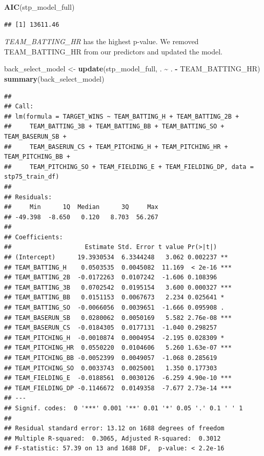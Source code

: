 \documentclass[
]{article}
\newenvironment{Shaded}{\begin{snugshade}}{\end{snugshade}}
\newcommand{\FunctionTok}[1]{\textcolor[rgb]{0.13,0.29,0.53}{\textbf{#1}}}
\newcommand{\NormalTok}[1]{#1}
\newcommand{\OtherTok}[1]{\textcolor[rgb]{0.56,0.35,0.01}{#1}}
\newcommand{\SpecialCharTok}[1]{\textcolor[rgb]{0.81,0.36,0.00}{\textbf{#1}}}
\begin{document}
\begin{Shaded}
\begin{Highlighting}[]
\FunctionTok{AIC}\NormalTok{(stp\_model\_full)}
\end{Highlighting}
\end{Shaded}

\begin{verbatim}
## [1] 13611.46
\end{verbatim}

\emph{TEAM\_BATTING\_HR} has the highest p-value. We removed
TEAM\_BATTING\_HR from our predictors and updated the model.

\begin{Shaded}
\begin{Highlighting}[]
\NormalTok{back\_select\_model }\OtherTok{\textless{}{-}} \FunctionTok{update}\NormalTok{(stp\_model\_full, . }\SpecialCharTok{\textasciitilde{}}\NormalTok{ . }\SpecialCharTok{{-}}\NormalTok{ TEAM\_BATTING\_HR)}
\FunctionTok{summary}\NormalTok{(back\_select\_model)}
\end{Highlighting}
\end{Shaded}

\begin{verbatim}
## 
## Call:
## lm(formula = TARGET_WINS ~ TEAM_BATTING_H + TEAM_BATTING_2B + 
##     TEAM_BATTING_3B + TEAM_BATTING_BB + TEAM_BATTING_SO + TEAM_BASERUN_SB + 
##     TEAM_BASERUN_CS + TEAM_PITCHING_H + TEAM_PITCHING_HR + TEAM_PITCHING_BB + 
##     TEAM_PITCHING_SO + TEAM_FIELDING_E + TEAM_FIELDING_DP, data = stp75_train_df)
## 
## Residuals:
##     Min      1Q  Median      3Q     Max 
## -49.398  -8.650   0.120   8.703  56.267 
## 
## Coefficients:
##                    Estimate Std. Error t value Pr(>|t|)    
## (Intercept)      19.3930534  6.3344248   3.062 0.002237 ** 
## TEAM_BATTING_H    0.0503535  0.0045082  11.169  < 2e-16 ***
## TEAM_BATTING_2B  -0.0172263  0.0107242  -1.606 0.108396    
## TEAM_BATTING_3B   0.0702542  0.0195154   3.600 0.000327 ***
## TEAM_BATTING_BB   0.0151153  0.0067673   2.234 0.025641 *  
## TEAM_BATTING_SO  -0.0066056  0.0039651  -1.666 0.095908 .  
## TEAM_BASERUN_SB   0.0280062  0.0050169   5.582 2.76e-08 ***
## TEAM_BASERUN_CS  -0.0184305  0.0177131  -1.040 0.298257    
## TEAM_PITCHING_H  -0.0010874  0.0004954  -2.195 0.028309 *  
## TEAM_PITCHING_HR  0.0550220  0.0104606   5.260 1.63e-07 ***
## TEAM_PITCHING_BB -0.0052399  0.0049057  -1.068 0.285619    
## TEAM_PITCHING_SO  0.0033743  0.0025001   1.350 0.177303    
## TEAM_FIELDING_E  -0.0188561  0.0030126  -6.259 4.90e-10 ***
## TEAM_FIELDING_DP -0.1146672  0.0149358  -7.677 2.73e-14 ***
## ---
## Signif. codes:  0 '***' 0.001 '**' 0.01 '*' 0.05 '.' 0.1 ' ' 1
## 
## Residual standard error: 13.12 on 1688 degrees of freedom
## Multiple R-squared:  0.3065, Adjusted R-squared:  0.3012 
## F-statistic: 57.39 on 13 and 1688 DF,  p-value: < 2.2e-16
\end{verbatim}
\end{document}

